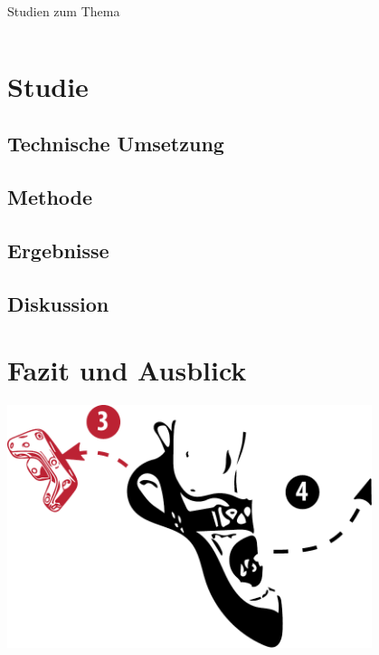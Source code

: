 \begin{frame}{Studien zum Thema}
\begin{columns}
\begin{column}{0.5\textwidth}
	\end{column}
\end{columns}
\end{frame}

\section{Studie}

\subsection{Technische Umsetzung}
\subsection{Methode}
\subsection{Ergebnisse}
\subsection{Diskussion}
\section{Fazit und Ausblick}

\begin{frame}[plain]
\begin{center}
	\includegraphics[width=0.8\textwidth]{include/images/climbing-shoe-with-instructions-off.pdf}
\end{center}
\end{frame}
